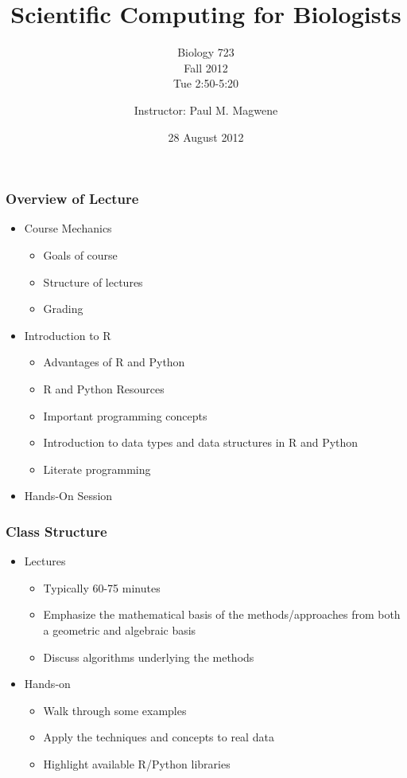 \documentclass{beamer}
\title{Scientific Computing for Biologists}
\subtitle{Biology 723\\
Fall 2012\\
Tue 2:50-5:20
}
\author[P. Magwene]{Instructor: Paul M. Magwene}
\institute[Bio 723]{
Email: paul.magwene@duke.edu\\
Phone: 613-8159
}
\date{28 August 2012}
\begin{document}
\begin{frame}
\titlepage
\end{frame}

\begin{frame}
  \frametitle{Overview of Lecture}
  
\begin{itemize}
		\item Course Mechanics
		\begin{itemize}
			\item Goals of course
			\item Structure of lectures
			\item Grading
		\end{itemize}
		\item Introduction to R
		\begin{itemize}
			\item Advantages of R and Python
			\item R and Python Resources
			\item Important programming concepts
			\item Introduction to data types and data structures in R and Python
			\item Literate programming
		\end{itemize}
		\item Hands-On Session
\end{itemize}

\end{frame}


\begin{frame}
  \frametitle{Class Structure}
\begin{itemize}
	\item Lectures	
	
		\begin{itemize}
			\item Typically 60-75 minutes
			\item Emphasize the mathematical basis of the methods/approaches from both a geometric and algebraic basis
			\item Discuss algorithms underlying the methods
		\end{itemize}
		
	\item Hands-on
	
			\begin{itemize}
				\item Walk through some examples
				\item Apply the techniques and concepts to real data
				\item Highlight available R/Python libraries
			\end{itemize}
	
\end{itemize}

\end{frame}
\end{document}
